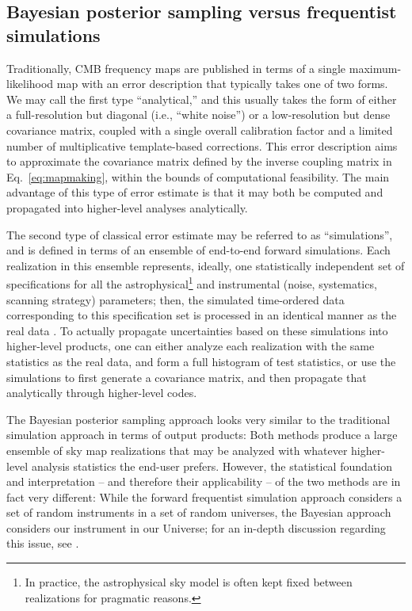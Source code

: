 \documentclass[twocolumn]{aa}
\begin{document}
\subsection{Bayesian posterior sampling versus frequentist simulations}

Traditionally, CMB frequency maps are published in terms of a single
maximum-likelihood map with an error description that typically takes
one of two forms. We may call the first type ``analytical,'' and this
usually takes the form of either a full-resolution but diagonal (i.e.,
``white noise'') or a low-resolution but dense covariance matrix,
coupled with a single overall calibration factor and a limited number
of multiplicative template-based corrections. This error description
aims to approximate the covariance matrix defined by the inverse
coupling matrix in Eq.~\eqref{eq:mapmaking}, within the bounds of
computational feasibility. The main advantage of this type of error
estimate is that it may both be computed and propagated into
higher-level analyses analytically.

The second type of classical error estimate may be referred to as
``simulations'', and is defined in terms of an ensemble of end-to-end
forward simulations. Each realization in this ensemble represents,
ideally, one statistically independent set of specifications for all
the astrophysical\footnote{In practice, the astrophysical sky model is
  often kept fixed between realizations for pragmatic reasons.} and
instrumental (noise, systematics, scanning strategy) parameters; then,
the simulated time-ordered data corresponding to this specification
set is processed in an identical manner as the real data
\citep[e.g.,][]{planck2014-a14}.  To actually propagate uncertainties
based on these simulations into higher-level products, one can either
analyze each realization with the same statistics as the real data,
and form a full histogram of test statistics, or use the simulations
to first generate a covariance matrix, and then propagate that
analytically through higher-level codes.

The Bayesian posterior sampling approach looks very similar to the
traditional simulation approach in terms of output products: Both
methods produce a large ensemble of sky map realizations that may be
analyzed with whatever higher-level analysis statistics the end-user
prefers. However, the statistical foundation and interpretation -- and
therefore their applicability -- of the two methods are in fact very
different: While the forward frequentist simulation approach considers
a set of random instruments in a set of random
universes, the Bayesian approach considers our instrument in
our Universe; for an in-depth discussion regarding this issue,
see \citet{bp04}.
\end{document}
